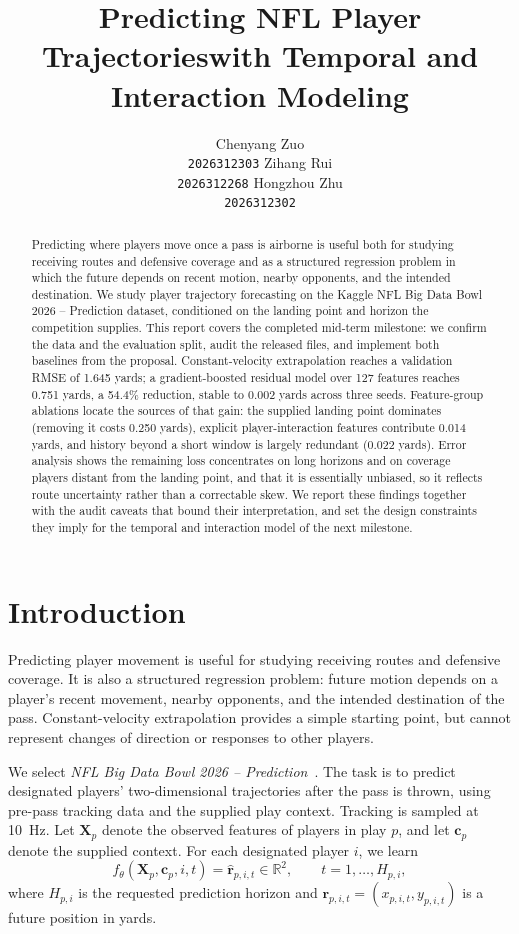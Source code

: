 \documentclass{article}
\title{Predicting NFL Player Trajectories\newline with Temporal and Interaction Modeling}
\author{%
  Chenyang Zuo \\
  \texttt{2026312303}
  \And
  Zihang Rui\\
  \texttt{2026312268}
  \And
  Hongzhou Zhu\\
  \texttt{2026312302}
}
\begin{document}
\maketitle

\begin{abstract}
Predicting where players move once a pass is airborne is useful both for studying
receiving routes and defensive coverage and as a structured regression problem in
which the future depends on recent motion, nearby opponents, and the intended
destination. We study player trajectory forecasting on the Kaggle NFL Big Data
Bowl 2026 -- Prediction dataset, conditioned on the landing point and horizon the
competition supplies. This report covers the completed mid-term milestone: we
confirm the data and the evaluation split, audit the released files, and implement
both baselines from the proposal. Constant-velocity extrapolation reaches a
validation RMSE of 1.645 yards; a gradient-boosted residual model over 127 features
reaches 0.751 yards, a 54.4\% reduction, stable to 0.002 yards across three seeds.
Feature-group ablations locate the sources of that gain: the supplied landing point
dominates (removing it costs 0.250 yards), explicit player-interaction features
contribute 0.014 yards, and history beyond a short window is largely redundant
(0.022 yards). Error analysis shows the remaining loss concentrates on long horizons
and on coverage players distant from the landing point, and that it is essentially
unbiased, so it reflects route uncertainty rather than a correctable skew. We report
these findings together with the audit caveats that bound their interpretation, and
set the design constraints they imply for the temporal and interaction model of the
next milestone.
\end{abstract}

\section{Introduction}

Predicting player movement is useful for studying receiving routes and defensive
coverage. It is also a structured regression problem: future motion depends on a
player's recent movement, nearby opponents, and the intended destination of the
pass. Constant-velocity extrapolation provides a simple starting point, but cannot
represent changes of direction or responses to other players.

We select \emph{NFL Big Data Bowl 2026 -- Prediction}~\cite{competition}. The task
is to predict designated players' two-dimensional trajectories after the pass is
thrown, using pre-pass tracking data and the supplied play context. Tracking is
sampled at 10~Hz. Let $\mathbf{X}_{p}$ denote the observed features of players in
play $p$, and let $\mathbf{c}_{p}$ denote the supplied context. For each designated
player $i$, we learn
\begin{equation}
 f_{\theta}(\mathbf{X}_{p},\mathbf{c}_{p},i,t)
 = \widehat{\mathbf{r}}_{p,i,t}\in\mathbb{R}^{2},
 \qquad t=1,\ldots,H_{p,i},
\end{equation}
where $H_{p,i}$ is the requested prediction horizon and
$\mathbf{r}_{p,i,t}=(x_{p,i,t},y_{p,i,t})$ is a future position in yards.
\end{document}
